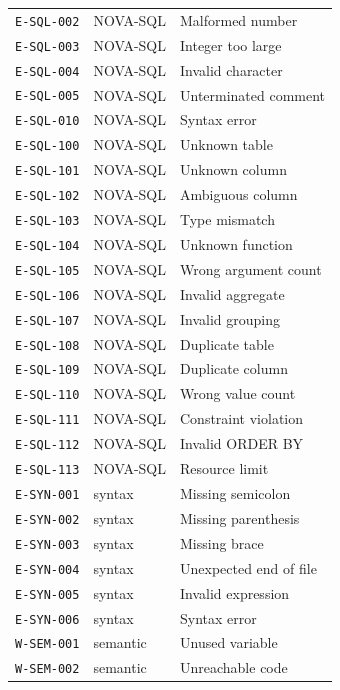 \begin{longtable}{@{}llp{}@{}}
\texttt{E-SQL-002} & NOVA-SQL & Malformed number\\
\texttt{E-SQL-003} & NOVA-SQL & Integer too large\\
\texttt{E-SQL-004} & NOVA-SQL & Invalid character\\
\texttt{E-SQL-005} & NOVA-SQL & Unterminated comment\\
\texttt{E-SQL-010} & NOVA-SQL & Syntax error\\
\texttt{E-SQL-100} & NOVA-SQL & Unknown table\\
\texttt{E-SQL-101} & NOVA-SQL & Unknown column\\
\texttt{E-SQL-102} & NOVA-SQL & Ambiguous column\\
\texttt{E-SQL-103} & NOVA-SQL & Type mismatch\\
\texttt{E-SQL-104} & NOVA-SQL & Unknown function\\
\texttt{E-SQL-105} & NOVA-SQL & Wrong argument count\\
\texttt{E-SQL-106} & NOVA-SQL & Invalid aggregate\\
\texttt{E-SQL-107} & NOVA-SQL & Invalid grouping\\
\texttt{E-SQL-108} & NOVA-SQL & Duplicate table\\
\texttt{E-SQL-109} & NOVA-SQL & Duplicate column\\
\texttt{E-SQL-110} & NOVA-SQL & Wrong value count\\
\texttt{E-SQL-111} & NOVA-SQL & Constraint violation\\
\texttt{E-SQL-112} & NOVA-SQL & Invalid ORDER BY\\
\texttt{E-SQL-113} & NOVA-SQL & Resource limit\\
\texttt{E-SYN-001} & syntax & Missing semicolon\\
\texttt{E-SYN-002} & syntax & Missing parenthesis\\
\texttt{E-SYN-003} & syntax & Missing brace\\
\texttt{E-SYN-004} & syntax & Unexpected end of file\\
\texttt{E-SYN-005} & syntax & Invalid expression\\
\texttt{E-SYN-006} & syntax & Syntax error\\
\texttt{W-SEM-001} & semantic & Unused variable\\
\texttt{W-SEM-002} & semantic & Unreachable code\\
\bottomrule
\end{longtable}

